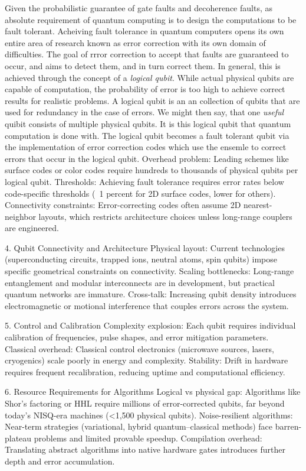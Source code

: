 \documentclass{elbioimp2}
\begin{document}
Given the probabilistic guarantee of gate faults and decoherence faults, as absolute requirement of quantum computing is to design the computations to be fault tolerant.
Acheiving fault tolerance in quantum computers opens its own entire area of research known as error correction with its own domain of difficulties. 
The goal of rrror correction  to accept that faults are guaranteed to occur, and aims to detect them, and in turn correct them.
In general, this is achieved through the concept of a \textit{logical qubit}. While actual physical qubits are capable of computation,
the probability of error is too high to achieve correct results for realistic problems. A logical qubit is an an {collection} of qubits that are used
for redundancy in the case of errors. We might then say, that one \textit{useful} quibit consists of multiple physical qubits. It is this logical qubit that quantum
computation is done with. The logical qubit becomes a fault tolerant qubit via the implementation of error correction codes which use the ensemle to correct errors that
occur in the logical qubit.
Overhead problem: Leading schemes like surface codes or color codes require hundreds to thousands of physical qubits per logical qubit.
Thresholds: Achieving fault tolerance requires error rates below code-specific thresholds (~1 percent for 2D surface codes, lower for others).
Connectivity constraints: Error-correcting codes often assume 2D nearest-neighbor layouts, which restricts architecture choices unless long-range couplers are engineered.

4. Qubit Connectivity and Architecture
Physical layout: Current technologies (superconducting circuits, trapped ions, neutral atoms, spin qubits) impose specific geometrical constraints on connectivity.
Scaling bottlenecks: Long-range entanglement and modular interconnects are in development, but practical quantum networks are immature.
Cross-talk: Increasing qubit density introduces electromagnetic or motional interference that couples errors across the system.

5. Control and Calibration
Complexity explosion: Each qubit requires individual calibration of frequencies, pulse shapes, and error mitigation parameters.
Classical overhead: Classical control electronics (microwave sources, lasers, cryogenics) scale poorly in energy and complexity.
Stability: Drift in hardware requires frequent recalibration, reducing uptime and computational efficiency.

6. Resource Requirements for Algorithms
Logical vs physical gap: Algorithms like Shor’s factoring or HHL require millions of error-corrected qubits, far beyond today’s NISQ-era machines (<1,500 physical qubits).
Noise-resilient algorithms: Near-term strategies (variational, hybrid quantum–classical methods) face barren-plateau problems and limited provable speedup.
Compilation overhead: Translating abstract algorithms into native hardware gates introduces further depth and error accumulation.
\end{document}
